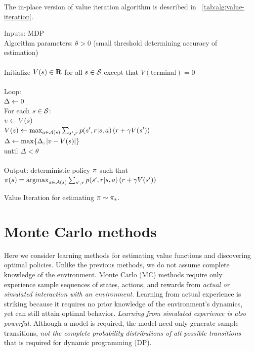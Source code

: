 The in-place version of value iteration algorithm is described in \tablename~\ref{tab:alg:value-iteration}.

\begin{table}
\beginalg
Inputs: MDP \\
Algorithm parameters: $\theta > 0$ (small threshold determining accuracy of estimation)\\
\\
Initialize $V(s) \in \mathbf{R}$ for all $s \in \mathcal{S}$ except that $V(\mathrm{terminal}) = 0$ \\
\\
Loop: \\
\> $\Delta \leftarrow 0$ \\
\> For each $s\in\mathcal{S}$: \\
\> \> $v\leftarrow V(s)$ \\
\> \> $V(s) \leftarrow \max_{a\in\mathcal{A}(s)} \sum_{{s'}, r} p({s'}, r|s,a) \left( r + \gamma V({s'}) \right)$ \\
\> \> $\Delta \leftarrow \max\{\Delta, |v-V(s)|\}$ \\
until $\Delta < \theta$\\
\\
Output: deterministic policy $\pi$ such that\\
\> $\pi(s) = \mathop{\mathrm {argmax}}_{a\in\mathcal{A}(s)} \sum_{{s'}, r} p({s'}, r|s,a) \left( r + \gamma V({s'}) \right)$
\endalg
\caption{Value Iteration for estimating $\pi \sim {\ensuremath{\pi}}_\ast$.}
\label{tab:alg:value-iteration}
\end{table}



\section{Monte Carlo methods}

Here we consider learning methods for estimating value functions and discovering optimal policies.
Unlike the previous methods,
we do not assume complete knowledge of the environment.
Monte Carlo (MC) methods require only experience sample sequences of states, actions, and rewards
from \emph{actual or simulated interaction with an environment}.
Learning from actual experience is striking because it requires no prior knowledge of the environment’s dynamics,
yet can still attain optimal behavior.
\emph{Learning from simulated experience is also powerful.}
Although a model is required,
the model need only generate sample transitions,
\emph{not the complete probability distributions of all possible transitions} that is required for dynamic programming (DP).

